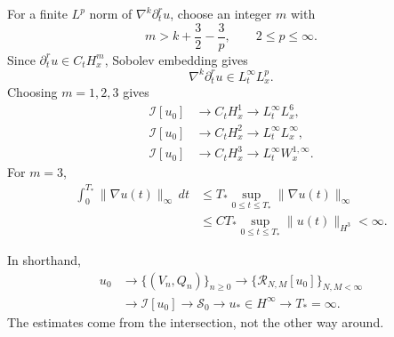 \documentclass[12pt]{article}
\newcommand{\I}{\mathcal I}
\newcommand{\cR}{\mathcal R}
\newcommand{\Szero}{\mathscr S_0}
\begin{document}
For a finite \(L^p\) norm of \(\nabla^k\partial_t^ru\), choose an integer
\(m\) with
\[
  m>k+\frac32-\frac3p,
  \qquad
  2\leq p\leq\infty.
\]
Since
\(\partial_t^ru\in C_tH_x^m\), Sobolev embedding gives
\[
  \nabla^k\partial_t^ru
  \in
  L_t^\infty L_x^p.
\]
Choosing \(m=1,2,3\) gives
\[
\begin{aligned}
  \I[u_0]
  &\longrightarrow
  C_tH_x^1
  \longrightarrow
  L_t^\infty L_x^6,
  \\
  \I[u_0]
  &\longrightarrow
  C_tH_x^2
  \longrightarrow
  L_t^\infty L_x^\infty,
  \\
  \I[u_0]
  &\longrightarrow
  C_tH_x^3
  \longrightarrow
  L_t^\infty W_x^{1,\infty}.
\end{aligned}
\]
For \(m=3\),
\[
\begin{aligned}
  \int_0^{T_*}\|\nabla u(t)\|_\infty\,dt
  &\leq
  T_*
  \sup_{0\leq t\leq T_*}
  \|\nabla u(t)\|_\infty
  \\
  &\leq
  C T_*
  \sup_{0\leq t\leq T_*}
  \|u(t)\|_{H^3}
  <
  \infty.
\end{aligned}
\]

In shorthand,
\[
\begin{aligned}
  u_0
  &\longrightarrow
  \{(V_n,Q_n)\}_{n\geq0}
  \longrightarrow
  \{\cR_{N,M}[u_0]\}_{N,M<\infty}
  \\
  &\longrightarrow
  \I[u_0]
  \longrightarrow
  \Szero
  \longrightarrow
  u_*\in H^\infty
  \longrightarrow
  T_*=\infty.
\end{aligned}
\]
The estimates come from the intersection, not the other way around.
\end{document}
